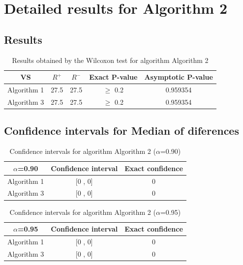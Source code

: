 \documentclass[a4paper,10pt]{article}
\begin{document}
 \clearpage 


\section{Detailed results for Algorithm 2}


\subsection{Results}

\begin{table}[!htp]
\centering\small
\begin{tabular}{
|c|c|c|c|c|}
\hline
 VS & $R^{+}$ & $R^{-}$ & Exact P-value & Asymptotic P-value \\ \hline 
Algorithm 1 & 27.5 & 27.5 & $\geq$ 0.2 & 0.959354\\ \hline 
Algorithm 3 & 27.5 & 27.5 & $\geq$ 0.2 & 0.959354\\ \hline 

\end{tabular}
\caption{Results obtained by the Wilcoxon test for algorithm Algorithm 2}
\end{table}

\subsection{Confidence intervals for Median of diferences}

\begin{table}[!htp]
\centering\small
\begin{tabular}{
|c|c|c|}
\hline
 $\alpha$=0.90 & Confidence interval & Exact confidence \\ \hline 
Algorithm 1 & [0 , 0] & 0\\ \hline 
Algorithm 3 & [0 , 0] & 0\\ \hline 

\end{tabular}
\caption{Confidence intervals for algorithm Algorithm 2 ($\alpha$=0.90)}
\end{table}
\begin{table}[!htp]
\centering\small
\begin{tabular}{
|c|c|c|}
\hline
 $\alpha$=0.95 & Confidence interval & Exact confidence \\ \hline 
Algorithm 1 & [0 , 0] & 0\\ \hline 
Algorithm 3 & [0 , 0] & 0\\ \hline 

\end{tabular}
\caption{Confidence intervals for algorithm Algorithm 2 ($\alpha$=0.95)}
\end{table}
\end{document}
